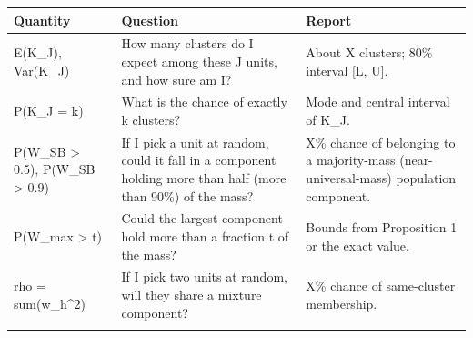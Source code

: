 \begin{longtable}{lll}
\toprule
Quantity & Question & Report \\
\midrule\endhead
E(K\_J), Var(K\_J) & How many clusters do I expect among these J units, and how sure am I? & About X clusters; 80\% interval [L, U]. \\ \addlinespace[3pt]
P(K\_J = k) & What is the chance of exactly k clusters? & Mode and central interval of K\_J. \\ \addlinespace[3pt]
P(W\_SB > 0.5), P(W\_SB > 0.9) & If I pick a unit at random, could it fall in a component holding more than half (more than 90\%) of the mass? & X\% chance of belonging to a majority-mass (near-universal-mass) population component. \\ \addlinespace[3pt]
P(W\_max > t) & Could the largest component hold more than a fraction t of the mass? & Bounds from Proposition 1 or the exact value. \\ \addlinespace[3pt]
rho = sum(w\_h^2) & If I pick two units at random, will they share a mixture component? & X\% chance of same-cluster membership. \\ \addlinespace[3pt]
\bottomrule\end{longtable}
